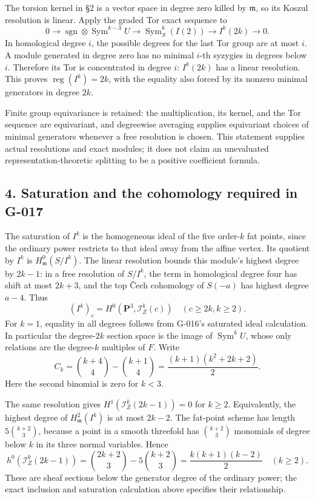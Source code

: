 \documentclass[
  10pt,
]{article}
\begin{document}
The torsion kernel in §2 is a vector space in degree zero killed by
\(\mathfrak m\), so its Koszul resolution is linear. Apply the graded
Tor exact sequence to \[
0\to\operatorname{sgn}\otimes\operatorname{Sym}^{k-3}U
\to\operatorname{Sym}^k_S(I(2))\to I^k(2k)\to0.
\] In homological degree \(i\), the possible degrees for the last Tor
group are at most \(i\). A module generated in degree zero has no
minimal \(i\)-th syzygies in degrees below \(i\). Therefore its Tor is
concentrated in degree \(i\): \(I^k(2k)\) has a linear resolution. This
proves \(\operatorname{reg}(I^k)=2k\), with the equality also forced by
its nonzero minimal generators in degree \(2k\).

Finite group equivariance is retained: the multiplication, its kernel,
and the Tor sequence are equivariant, and degreewise averaging supplies
equivariant choices of minimal generators whenever a free resolution is
chosen. This statement supplies actual resolutions and exact modules; it
does not claim an unevaluated representation-theoretic splitting to be a
positive coefficient formula.

\subsection{4. Saturation and the cohomology required in
G-017}\label{saturation-and-the-cohomology-required-in-g-017}

The saturation of \(I^k\) is the homogeneous ideal of the five
order-\(k\) fat points, since the ordinary power restricts to that ideal
away from the affine vertex. Its quotient by \(I^k\) is
\(H^0_{\mathfrak m}(S/I^k)\). The linear resolution bounds this module's
highest degree by \(2k-1\): in a free resolution of \(S/I^k\), the term
in homological degree four has shift at most \(2k+3\), and the top Čech
cohomology of \(S(-a)\) has highest degree \(a-4\). Thus \[
(I^k)_c=H^0(\mathbf P^3,\mathcal I_Z^k(c))
\quad(c\ge2k,k\ge2).
\] For \(k=1\), equality in all degrees follows from G-016's saturated
ideal calculation. In particular the degree-\(2k\) section space is the
image of \(\operatorname{Sym}^kU\), whose only relations are the
degree-\(k\) multiples of \(F\). Write \[
C_k=\binom{k+4}{4}-\binom{k+1}{4}
=\frac{(k+1)(k^2+2k+2)}2.
\] Here the second binomial is zero for \(k<3\).

The same resolution gives \(H^1(\mathcal I_Z^k(2k-1))=0\) for \(k\ge2\).
Equivalently, the highest degree of \(H^2_{\mathfrak m}(I^k)\) is at
most \(2k-2\). The fat-point scheme has length \(5\binom{k+2}{3}\),
because a point in a smooth threefold has \(\binom{k+2}{3}\) monomials
of degree below \(k\) in its three normal variables. Hence \[
h^0(\mathcal I_Z^k(2k-1))
=\binom{2k+2}{3}-5\binom{k+2}{3}
=\frac{k(k+1)(k-2)}2
\quad(k\ge2).
\] These are sheaf sections below the generator degree of the ordinary
power; the exact inclusion and saturation calculation above specifies
their relationship.
\end{document}

